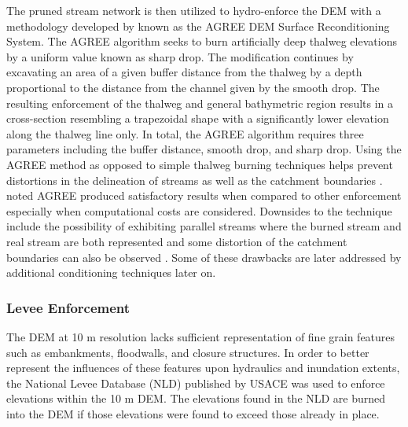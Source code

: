 \documentclass[draft]{dependencies/agujournal2019}
\begin{document}
The pruned stream network is then utilized to hydro-enforce the DEM with a methodology developed by  known as the AGREE DEM Surface Reconditioning System. 
The AGREE algorithm seeks to burn artificially deep thalweg elevations by a uniform value known as sharp drop. 
The modification continues by excavating an area of a given buffer distance from the thalweg by a depth proportional to the distance from the channel given by the smooth drop. 
The resulting enforcement of the thalweg and general bathymetric region results in a cross-section resembling a trapezoidal shape with a significantly lower elevation along the thalweg line only.
In total, the AGREE algorithm requires three parameters including the buffer distance, smooth drop, and sharp drop. 
Using the AGREE method as opposed to simple thalweg burning techniques helps prevent distortions in the delineation of streams as well as the catchment boundaries \cite{saunders1995grid,saunders1996gis,mizgalewicz1996modeling,hellweger1997agree,quenzer1998gis,baker2006comparison}.
 noted AGREE produced satisfactory results when compared to other enforcement especially when computational costs are considered. 
Downsides to the technique include the possibility of exhibiting parallel streams where the burned stream and real stream are both represented \cite{hellweger1997agree,saunders1999preparation} and some distortion of the catchment boundaries can also be observed \cite{saunders1999preparation,saunders1996gis}. Some of these drawbacks are later addressed by additional conditioning techniques later on.
%
\subsubsection{Levee Enforcement}
%
The DEM at 10 m resolution lacks sufficient representation of fine grain features such as embankments, floodwalls, and closure structures.
In order to better represent the influences of these features upon hydraulics and inundation extents, the National Levee Database (NLD) published by USACE was used to enforce elevations within the 10 m DEM.
The elevations found in the NLD are burned into the DEM if those elevations were found to exceed those already in place.
%
\end{document}
